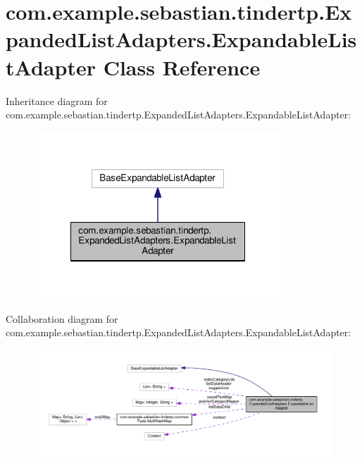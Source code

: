 \hypertarget{classcom_1_1example_1_1sebastian_1_1tindertp_1_1ExpandedListAdapters_1_1ExpandableListAdapter}{}\section{com.\+example.\+sebastian.\+tindertp.\+Expanded\+List\+Adapters.\+Expandable\+List\+Adapter Class Reference}
\label{classcom_1_1example_1_1sebastian_1_1tindertp_1_1ExpandedListAdapters_1_1ExpandableListAdapter}


Inheritance diagram for com.\+example.\+sebastian.\+tindertp.\+Expanded\+List\+Adapters.\+Expandable\+List\+Adapter\+:\nopagebreak
\begin{figure}[H]
\begin{center}
\leavevmode
\includegraphics[width=264pt]{classcom_1_1example_1_1sebastian_1_1tindertp_1_1ExpandedListAdapters_1_1ExpandableListAdapter__inherit__graph}
\end{center}
\end{figure}


Collaboration diagram for com.\+example.\+sebastian.\+tindertp.\+Expanded\+List\+Adapters.\+Expandable\+List\+Adapter\+:\nopagebreak
\begin{figure}[H]
\begin{center}
\leavevmode
\includegraphics[width=350pt]{classcom_1_1example_1_1sebastian_1_1tindertp_1_1ExpandedListAdapters_1_1ExpandableListAdapter__coll__graph}
\end{center}
\end{figure}
